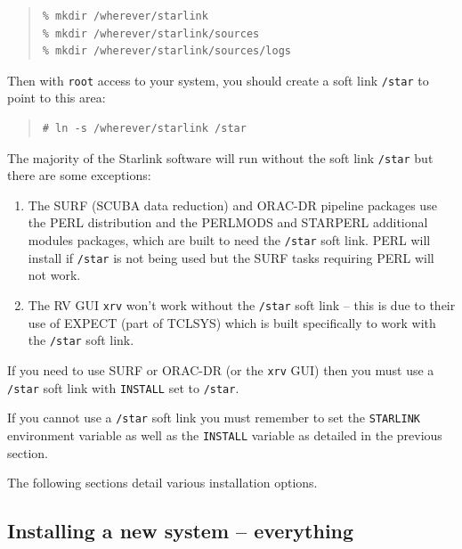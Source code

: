\documentclass[twoside,11pt]{article}
\newcommand{\xlabel}[1]{}
\renewcommand{\_}{\texttt{\symbol{95}}}
\begin{document}
\begin{quote}   
\begin{verbatim}
% mkdir /wherever/starlink
% mkdir /wherever/starlink/sources
% mkdir /wherever/starlink/sources/logs
\end{verbatim}
\end{quote}

Then with \texttt{root} access to your system, you should create a soft
link \texttt{/star} to point to this area:

\begin{quote}
\begin{verbatim}
# ln -s /wherever/starlink /star
\end{verbatim}
\end{quote}

The majority of the Starlink software will run without the soft
link \texttt{/star} but there are some exceptions:  

\begin{enumerate}

\item The SURF (SCUBA data reduction) and ORAC-DR pipeline packages use the
PERL distribution and the PERLMODS and STARPERL additional modules packages,
which are built to need the \texttt{/star} soft link.  PERL will install
if \texttt{/star} is not being used but the SURF tasks requiring PERL
will not work.

\item The RV GUI \texttt{xrv} won't work without the \texttt{/star}
soft link -- this is due to their use of EXPECT (part of TCLSYS) which
is built specifically to work with the \texttt{/star} soft link.

\end{enumerate}

If you need to use SURF or ORAC-DR (or the \texttt{xrv} GUI) then you must use
a \texttt{/star} soft link with \texttt{INSTALL} set to \texttt{/star}.

If you cannot use a \texttt{/star} soft link you must remember to set the 
\texttt{STARLINK} environment variable as well as the \texttt{INSTALL}
variable as detailed in the previous section.

The following sections detail various installation options.

\subsection{\xlabel{installing_a_new_system-everything}Installing a new system -- everything}
\label{installing_a_new_system-everything}
\end{document}
